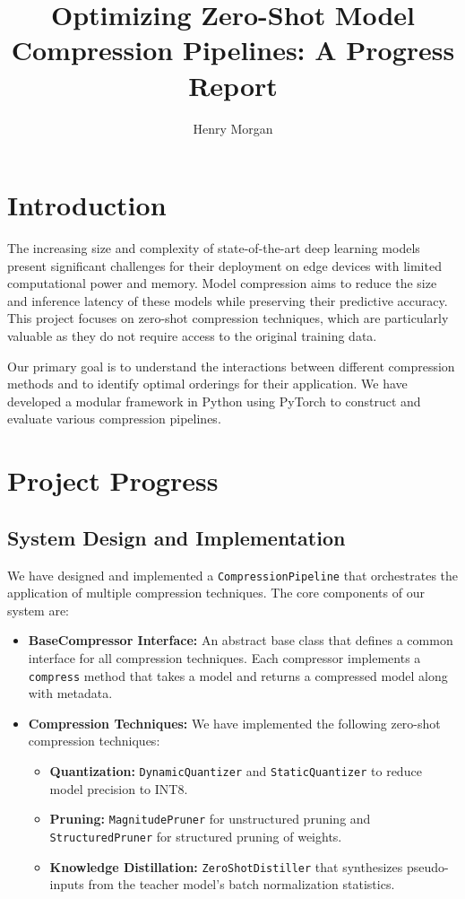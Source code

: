 \documentclass[sigconf]{acmart}
\title{Optimizing Zero-Shot Model Compression Pipelines: A Progress Report}
\author{Henry Morgan}
\affiliation{%
  \institution{University of Washington Bothell}
  \country{USA}
}
\begin{document}
\maketitle

\section{Introduction}
The increasing size and complexity of state-of-the-art deep learning models present significant challenges for their deployment on edge devices with limited computational power and memory. Model compression aims to reduce the size and inference latency of these models while preserving their predictive accuracy. This project focuses on zero-shot compression techniques, which are particularly valuable as they do not require access to the original training data.

Our primary goal is to understand the interactions between different compression methods and to identify optimal orderings for their application. We have developed a modular framework in Python using PyTorch to construct and evaluate various compression pipelines.

\section{Project Progress}

\subsection{System Design and Implementation}
We have designed and implemented a \texttt{CompressionPipeline} that orchestrates the application of multiple compression techniques. The core components of our system are:

\begin{itemize}
    \item \textbf{BaseCompressor Interface:} An abstract base class that defines a common interface for all compression techniques. Each compressor implements a \texttt{compress} method that takes a model and returns a compressed model along with metadata.
    \item \textbf{Compression Techniques:} We have implemented the following zero-shot compression techniques:
    \begin{itemize}
        \item \textbf{Quantization:} \texttt{DynamicQuantizer} and \texttt{StaticQuantizer} to reduce model precision to INT8.
        \item \textbf{Pruning:} \texttt{MagnitudePruner} for unstructured pruning and \texttt{StructuredPruner} for structured pruning of weights.
        \item \textbf{Knowledge Distillation:} \texttt{ZeroShotDistiller} that synthesizes pseudo-inputs from the teacher model's batch normalization statistics.
    \end{itemize}

\end{itemize}
\end{document}
